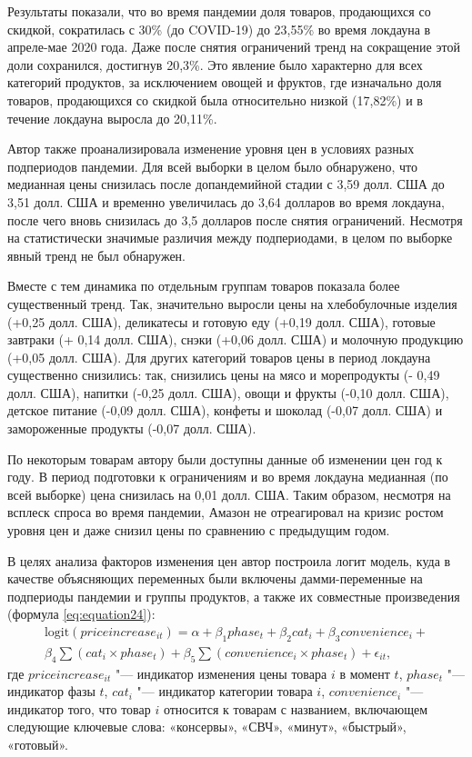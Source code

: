Результаты показали, что во время пандемии доля товаров, продающихся со скидкой, сократилась с 30\% (до COVID-19) до 23,55\% во время локдауна в апреле-мае 2020 года. Даже после снятия ограничений тренд на сокращение этой доли сохранился, достигнув 20,3\%. Это явление было характерно для всех категорий продуктов, за исключением овощей и фруктов, где изначально доля товаров, продающихся со скидкой была относительно низкой (17,82\%) и в течение локдауна выросла до 20,11\%.

Автор также проанализировала изменение уровня цен в условиях разных подпериодов пандемии. Для всей выборки в целом было обнаружено, что медианная цены снизилась после допандемийной стадии с 3,59 долл. США до 3,51 долл. США и временно увеличилась до 3,64 долларов во время локдауна, после чего вновь снизилась до 3,5 долларов после снятия ограничений. Несмотря на статистически значимые различия между подпериодами, в целом по выборке явный тренд не был обнаружен.

Вместе с тем динамика по отдельным группам товаров показала более существенный тренд. Так, значительно выросли цены на хлебобулочные изделия (+0,25 долл. США), деликатесы и готовую еду (+0,19 долл. США), готовые завтраки (+ 0,14 долл. США), снэки (+0,06 долл. США) и молочную продукцию (+0,05 долл. США). Для других категорий товаров цены в период локдауна существенно снизились: так, снизились цены на мясо и морепродукты (- 0,49 долл. США), напитки (-0,25 долл. США), овощи и фрукты (-0,10 долл. США), детское питание (-0,09 долл. США), конфеты и шоколад (-0,07 долл. США) и замороженные продукты (-0,07 долл. США).

По некоторым товарам автору были доступны данные об изменении цен год к году. В период подготовки к ограничениям и во время локдауна медианная (по всей выборке) цена снизилась на 0,01 долл. США. Таким образом, несмотря на всплеск спроса во время пандемии, Амазон не отреагировал на кризис ростом уровня цен и даже снизил цены по сравнению с предыдущим годом.

В целях анализа факторов изменения цен автор построила логит модель, куда в качестве объясняющих переменных были включены дамми-переменные на подпериоды пандемии и группы продуктов, а также их совместные произведения (формула \eqref{eq:equation24}):
\begin{multline}
	\label{eq:equation24}
	\text{logit}(priceincrease_{it}) = \alpha + \beta_1 phase_t + \beta_2 cat_i + \beta_3 convenience_i + \\
	\beta_4 \sum (cat_i \times phase_t) + \beta_5 \sum (convenience_i \times phase_t) + \epsilon_{it},
\end{multline}
где \( priceincrease_{it} \) "--- индикатор изменения цены товара $i$ в момент $t$, \( phase_t \) "--- индикатор фазы $t$, \( cat_i \) "--- индикатор категории товара $i$, \( convenience_i \) "--- индикатор того, что товар $i$ относится к товарам с названием, включающем следующие ключевые слова: «консервы», «СВЧ», «минут», «быстрый», «готовый».

